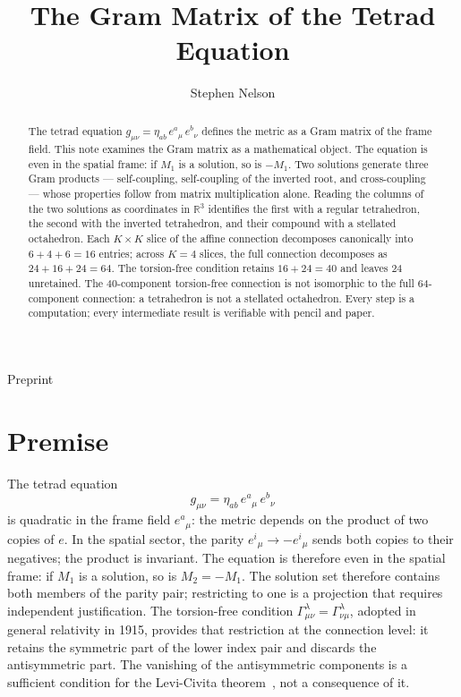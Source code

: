\documentclass[twocolumn]{iopjournal}
\renewcommand{\articletype}[1]{%
  {\vspace*{-8mm}\noindent \Large \sf Preprint}\par
  \vspace*{6mm}\noindent{\scriptsize \sf{\bfseries \MakeUppercase{#1}}}}
\theoremstyle{definition}
\begin{document}
\articletype{Supplementary Material}

\title{The Gram Matrix of the Tetrad Equation}

\author{Stephen Nelson}



\begin{abstract}
The tetrad equation $g_{\mu\nu} = \eta_{ab}\,e^a{}_\mu\,e^b{}_\nu$
defines the metric as a Gram matrix of the frame field.  This note
examines the Gram matrix as a mathematical object.  The equation is
even in the spatial frame: if $M_1$ is a solution, so is $-M_1$.  Two
solutions generate three Gram products --- self-coupling, self-coupling
of the inverted root, and cross-coupling --- whose properties follow
from matrix multiplication alone.  Reading the columns of the two
solutions as coordinates in $\mathbb{R}^3$ identifies the first with
a regular tetrahedron, the second with the inverted tetrahedron, and
their compound with a stellated octahedron.  Each $K \times K$ slice
of the affine connection decomposes canonically into $6 + 4 + 6 = 16$
entries; across $K = 4$ slices, the full connection decomposes as
$24 + 16 + 24 = 64$.  The torsion-free condition retains
$16 + 24 = 40$ and leaves 24 unretained.  The 40-component
torsion-free connection is not isomorphic to the full 64-component
connection: a tetrahedron is not a stellated octahedron.
Every step is a computation; every intermediate result is verifiable
with pencil and paper.
\end{abstract}


\section*{Premise}

The tetrad equation
\begin{equation}
  g_{\mu\nu} = \eta_{ab}\,e^a{}_\mu\,e^b{}_\nu
  \label{eq:tetrad}
\end{equation}
is quadratic in the frame field $e^a{}_\mu$: the metric depends on the
product of two copies of $e$.  In the spatial sector, the parity
$e^i{}_\mu \to -e^i{}_\mu$ sends both copies to their negatives; the
product is invariant.  The equation is therefore even in the spatial
frame: if $M_1$ is a solution, so is $M_2 = -M_1$.  The solution set
therefore contains both members of the parity pair; restricting to one
is a projection that requires independent justification.
The torsion-free condition
$\Gamma^\lambda_{\mu\nu} = \Gamma^\lambda_{\nu\mu}$, adopted in
general relativity in 1915,
provides that restriction at the connection level: it retains the
symmetric part of the lower index pair and discards the antisymmetric
part.  The vanishing of the antisymmetric components is a sufficient
condition for the Levi-Civita theorem~\cite{LeviCivita1917}, not a consequence of it.
\end{document}
